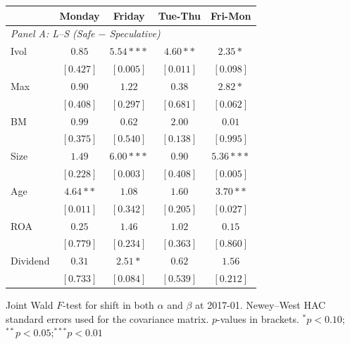 \centering
\footnotesize
\begin{tabular}{l c c c c}
\toprule
 & Monday & Friday & Tue-Thu & Fri-Mon \\
\midrule
\multicolumn{5}{l}{\textit{Panel A: L--S (Safe $-$ Speculative)}} \\
Ivol & $0.85$ & $5.54***$ & $4.60**$ & $2.35*$ \\
 & $[0.427]$ & $[0.005]$ & $[0.011]$ & $[0.098]$ \\
Max & $0.90$ & $1.22$ & $0.38$ & $2.82*$ \\
 & $[0.408]$ & $[0.297]$ & $[0.681]$ & $[0.062]$ \\
BM & $0.99$ & $0.62$ & $2.00$ & $0.01$ \\
 & $[0.375]$ & $[0.540]$ & $[0.138]$ & $[0.995]$ \\
Size & $1.49$ & $6.00***$ & $0.90$ & $5.36***$ \\
 & $[0.228]$ & $[0.003]$ & $[0.408]$ & $[0.005]$ \\
Age & $4.64**$ & $1.08$ & $1.60$ & $3.70**$ \\
 & $[0.011]$ & $[0.342]$ & $[0.205]$ & $[0.027]$ \\
ROA & $0.25$ & $1.46$ & $1.02$ & $0.15$ \\
 & $[0.779]$ & $[0.234]$ & $[0.363]$ & $[0.860]$ \\
Dividend & $0.31$ & $2.51*$ & $0.62$ & $1.56$ \\
 & $[0.733]$ & $[0.084]$ & $[0.539]$ & $[0.212]$ \\
\bottomrule
\end{tabular}
\vspace{4pt}
\begin{minipage}{0.9\textwidth}
\footnotesize
Joint Wald $F$-test for shift in both $\alpha$ and $\beta$ at 2017-01.
Newey--West HAC standard errors used for the covariance matrix.
$p$-values in brackets. $^{*}p<0.10$;\quad $^{**}p<0.05$;\quad $^{***}p<0.01$
\end{minipage}